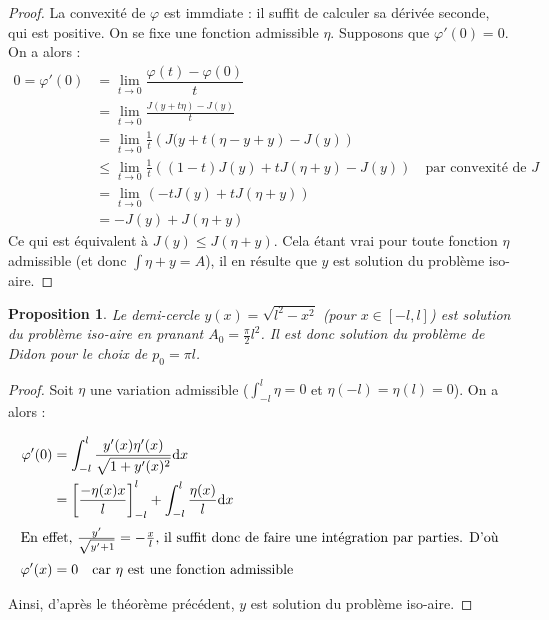 \documentclass[10pt,a4paper]{article}
\renewcommand{\d}{\mathrm{d}}
\renewcommand{\phi}{\varphi}
\theoremstyle{plain}
\newtheorem{prop}[thm]{Proposition}
\theoremstyle{definition}
\begin{document}
\begin{proof}
La convexité de $\phi$ est immdiate : il suffit de calculer sa dérivée seconde, qui est positive.
On se fixe une fonction admissible $\eta$. Supposons que $\phi'(0)=0$. On a alors :
\begin{align*}
0=\phi'(0)&=\lim_{t\to 0}\dfrac{\phi(t)-\phi(0)}{t}\\
			&= \lim_{t\to0}\frac{J(y+t\eta)-J(y)}{t}\\
			&= \lim_{t\to0}\frac{1}{t}\left(J(y+t(\eta-y+y)-J(y)\right)\\
			&\leqslant\lim_{t\to0}\frac{1}{t}\left((1-t)J(y)+tJ(\eta+y)-J(y)\right)\quad\text{par convexité de $J$}\\
			&= \lim_{t\to0}\left(-tJ(y)+tJ(\eta+y)\right)\\
			&= -J(y)+J(\eta+y)
\end{align*}
Ce qui est équivalent à $J(y)\leqslant J(\eta+y)$. Cela étant vrai pour toute fonction $\eta$ admissible (et donc $\int\eta+y=A$), il en résulte que $y$ est solution du problème iso-aire. 
\end{proof}




\begin{prop}
Le demi-cercle $y(x)=\sqrt{l^2-x^2}$ (pour $x\in[-l,l]$) est solution du problème iso-aire en pranant $A_0=\frac{\pi}{2}l^2$. Il est donc solution du problème de Didon pour le choix de $p_0=\pi l$.
\end{prop}



\begin{proof}
Soit $\eta$ une variation admissible ($\int_{-l}^l\eta=0$ et $\eta(-l)=\eta(l)=0$). On a alors :

\begin{align*}
\varphi'(0) &= \int_{-l}^l \frac{y'(x)\eta'(x)}{\sqrt{1+y'(x)^2}}\d x\\
			&= \left[\frac{-\eta(x) x}{l}\right]_{-l}^l + \int_{-l}^l\frac{\eta(x)}{l}\d x\\
\intertext{En effet, $\frac{y'}{\sqrt{y'+1}}=-\frac{x}{l}$, il suffit donc de faire une intégration par parties. D'où}
\varphi'(x)&= 0\quad\text{car }\eta\text{ est une fonction admissible}
\end{align*}

Ainsi, d'après le théorème précédent, $y$ est solution du problème iso-aire.
\end{proof}








\end{document}
